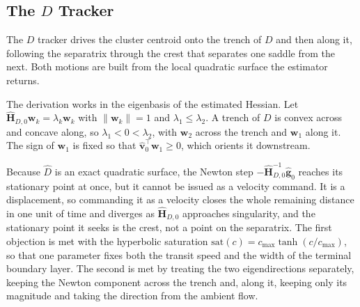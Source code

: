 \documentclass[lettersize,journal]{IEEEtran}
\begin{document}
\subsection{The $D$ Tracker}
\label{sec:sep_controller}

The $D$ tracker drives the cluster centroid onto the trench of $D$ and
then along it, following the separatrix through the crest that separates
one saddle from the next. Both motions are built from the local
quadratic surface the estimator returns.

The derivation works in the eigenbasis of the estimated Hessian. Let
$\hat{\mathbf{H}}_{D,0}\mathbf{w}_k = \lambda_k \mathbf{w}_k$ with
$\|\mathbf{w}_k\| = 1$ and $\lambda_1 \leq \lambda_2$. A trench of $D$
is convex across and concave along, so $\lambda_1 < 0 < \lambda_2$,
with $\mathbf{w}_2$ across the trench and $\mathbf{w}_1$ along it. The
sign of $\mathbf{w}_1$ is fixed so that $\hat{\mathbf{v}}_0^\top
\mathbf{w}_1 \geq 0$, which orients it downstream.

Because $\hat{D}$ is an exact quadratic surface, the Newton step
$-\hat{\mathbf{H}}_{D,0}^{-1}\hat{\mathbf{g}}_0$ reaches its stationary
point at once, but it cannot be issued as a velocity command.
It is a displacement, so commanding it as a velocity closes the whole
remaining distance in one unit of time and diverges as
$\hat{\mathbf{H}}_{D,0}$ approaches singularity, and the stationary
point it seeks is the crest, not a point on the separatrix. The first objection is met with the hyperbolic saturation
$\mathrm{sat}(c) = c_{\max}\tanh(c/c_{\max})$,
so that one parameter fixes both the transit speed and the width of the
terminal boundary layer. The second is met by treating the two
eigendirections separately, keeping the Newton component across the
trench and, along it, keeping only its magnitude and taking the
direction from the ambient flow.
\end{document}

